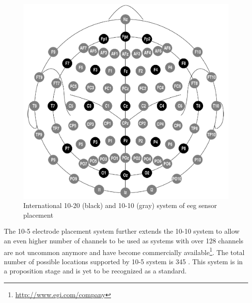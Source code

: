 \begin{figure}[htb]
	\centering
	\includegraphics[width=1\linewidth]{fig/system10-10.png}
	\caption[Caption for LOF]{International 10-20 (black) and 10-10 (gray) system of \gls{eeg} sensor placement\protect\footnotemark}
	\label{fig:system1010}
\end{figure}

The 10-5 electrode placement system further extends the 10-10 system to allow an
even higher number of channels to be used as systems with over 128 channels are
not uncommon anymore and have become commercially available\footnote{\url{http://www.egi.com/company}}.
The total number of possible locations supported by 10-5 system is 345 \cite{placeSys}.
This system is in a proposition stage and is yet to be recognized as a standard.



